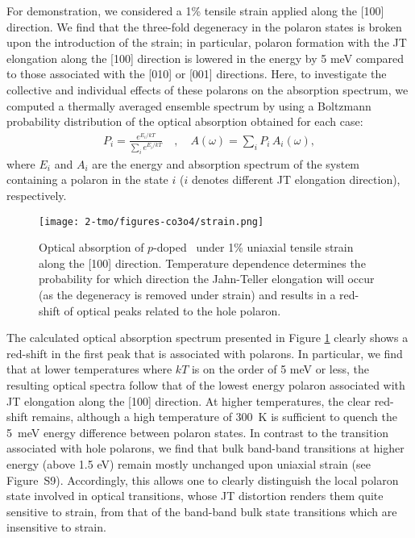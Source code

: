 For demonstration, we considered a 1\% tensile strain applied along the [100] direction. We find that the three-fold degeneracy in the polaron states is broken upon the introduction of the strain; in particular, polaron formation with the JT elongation along the [100] direction is  lowered  in  the  energy  by  5  meV  compared  to  those  associated  with  the  [010]  or  [001] directions.   Here,  to  investigate  the  collective  and  individual  effects  of  these  polarons  on the absorption spectrum, we computed a thermally averaged ensemble spectrum by using a Boltzmann probability distribution of the optical absorption obtained for each case:
\begin{align}
    P_i = \frac{e^{E_i/kT}}{\sum_i e^{E_i/kT}} \quad , \quad A(\omega)=\sum_{i}P_i\,A_i(\omega)\label{co3o4:eq:bolt},
\end{align}
where $E_{i}$ and $A_{i}$ are the energy and absorption spectrum of the system containing a polaron in the state $i$ ($i$ denotes different JT elongation direction), respectively.

\begin{figure}%
\begin{center}
\texttt{[image: 2-tmo/figures-co3o4/strain.png]}
\caption{Optical absorption of $p$-doped \co\ under 1\% uniaxial tensile strain along the [100] direction. Temperature dependence determines the probability for which direction the Jahn-Teller elongation will occur (as the degeneracy is removed under strain) and results in a red-shift of optical peaks related to the hole polaron.}  \label{co3o4:fig:strain}
\end{center}
\end{figure}

The calculated optical absorption spectrum presented in Figure \ref{co3o4:fig:strain} clearly shows a red-shift in the first peak that is associated with polarons. In particular, we find that at lower temperatures where $kT$ is on the order of 5 meV or less, the resulting optical spectra follow that of the lowest energy polaron associated with JT elongation along the [100] direction. At higher temperatures, the clear red-shift remains, although a high temperature of 300~K is sufficient to quench the 5~meV energy difference between polaron states. In contrast to the transition associated with hole polarons, we find that bulk band-band transitions at higher energy (above 1.5 eV) remain mostly unchanged upon uniaxial strain (see Figure~S9). Accordingly, this allows one to clearly distinguish the local polaron state involved in optical transitions, whose JT distortion renders them quite sensitive to strain, from that of the band-band bulk state transitions which are insensitive to strain.

